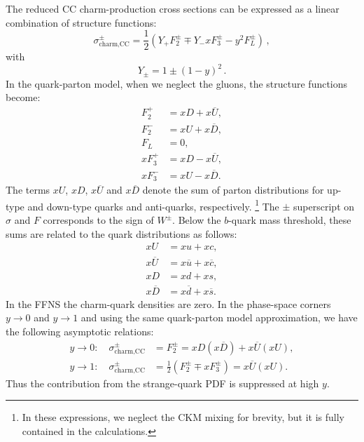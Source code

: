 \documentclass[pdftex,twocolumn,epjc3]{svjour3}          %
\begin{document}
The reduced CC charm-production cross sections can be expressed as a
linear combination of structure functions:
\begin{equation}
  \sigma^{\pm}_{\text{charm,CC}} = \frac12\left(Y_{+}F_2^{\pm} \mp
    Y_{-}xF_3^{\pm} - y^2F_L^{\pm}\right)\,,
\end{equation}
with 
\begin{equation}
  Y_{\pm} = 1 \pm (1-y)^2 \,.
\end{equation}
In the quark-parton model,
%
%
when we neglect the gluons, the structure
functions become:
\begin{equation}
\begin{split}
    F_2^{+} &= xD + x\overline{U}, \\
    F_2^{-} &= xU + x\overline{D},\\
    F_L &= 0,\\
    xF_3^{+} &= xD - x\overline{U}, \\
    xF_3^{-} &= xU - x\overline{D}.
\end{split}
\end{equation}
The terms $xU$, $xD$, $x\overline{U}$ and $x\overline{D}$ denote the
sum of parton distributions for up-type and down-type quarks and
anti-quarks, respectively.%
\footnote{In these expressions, we neglect the CKM mixing for brevity, but it is fully contained in the calculations.}
%
The $\pm$ superscript on $\sigma$ and $F$ corresponds to the sign of $W^\pm$. 
%
Below the $b$-quark mass threshold, these
sums are related to the quark distributions as follows:
\begin{equation}
\begin{split}
 xU &= xu + xc , \\
 x\overline{U} &= x\overline{u} + x\overline{c} , \\
 xD &= xd + xs , \\
 x\overline{D} &= x\overline{d} + x\overline{s}.
\end{split}
\end{equation}
In the FFNS the charm-quark densities are zero. In the phase-space
corners $y \to 0$ and $y \to 1$ and using the same quark-parton model approximation, we have the following asymptotic
relations:
\begin{equation}
\begin{split}
 y \to 0: \quad \sigma^{\pm}_{\text{charm,CC}} &= F_2^{\pm} = xD(x\overline{D}) + x\overline{U}(xU), \\[10pt]
 y \to 1: \quad \sigma^{\pm}_{\text{charm,CC}} &= \frac12(F_2^{\pm} \mp xF_3^{\pm}) = x\overline{U} (xU).
\label{eq:y01}
\end{split}
\end{equation}
Thus the contribution from the strange-quark PDF is suppressed at high $y$.
\end{document}
